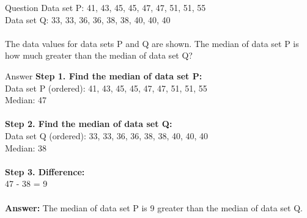 \documentclass{beamer}
\begin{document}
\begin{frame}
\end{frame}


\begin{frame}{Question}
Data set P: 41, 43, 45, 45, 47, 47, 51, 51, 55 \\
Data set Q: 33, 33, 36, 36, 38, 38, 40, 40, 40 \\
\\
The data values for data sets P and Q are shown. The median of data set P is how much greater than the median of data set Q?
\end{frame}


\begin{frame}{Answer}
\textbf{Step 1. Find the median of data set P:} \\
Data set P (ordered): 41, 43, 45, 45, 47, 47, 51, 51, 55 \\
Median: 47 \\
\\
\textbf{Step 2. Find the median of data set Q:} \\
Data set Q (ordered): 33, 33, 36, 36, 38, 38, 40, 40, 40 \\
Median: 38 \\
\\
\textbf{Step 3. Difference:} \\
47 - 38 = 9 \\
\\
\textbf{Answer:} The median of data set P is 9 greater than the median of data set Q.
\end{frame}
\end{document}
